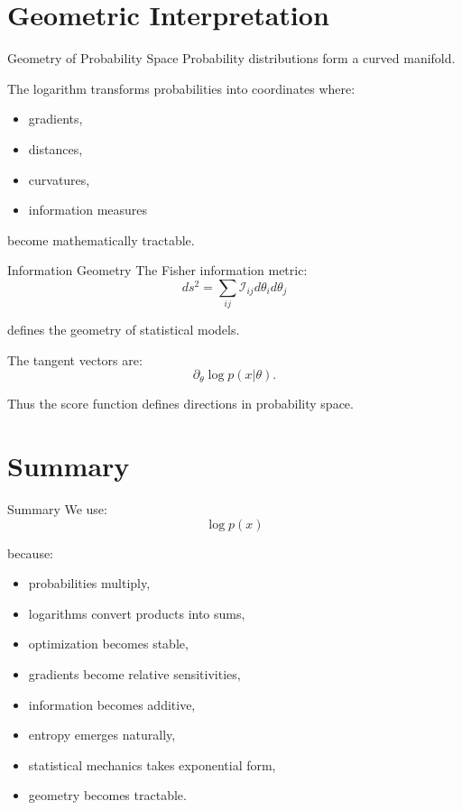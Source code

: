 \documentclass{beamer}
\begin{document}
\section{Geometric Interpretation}

\begin{frame}{Geometry of Probability Space}
Probability distributions form a curved manifold.

\pause

The logarithm transforms probabilities into coordinates where:
\begin{itemize}
\item gradients,
\item distances,
\item curvatures,
\item information measures
\end{itemize}

become mathematically tractable.
\end{frame}

\begin{frame}{Information Geometry}
The Fisher information metric:
\[
ds^2
=
\sum_{ij}
\mathcal I_{ij}
d\theta_i d\theta_j
\]

defines the geometry of statistical models.

\pause

The tangent vectors are:
\[
\partial_\theta \log p(x|\theta).
\]

Thus the score function defines directions in probability space.
\end{frame}

\section{Summary}

\begin{frame}{Summary}
We use:
\[
\log p(x)
\]

because:

\begin{itemize}
\item probabilities multiply,
\item logarithms convert products into sums,
\item optimization becomes stable,
\item gradients become relative sensitivities,
\item information becomes additive,
\item entropy emerges naturally,
\item statistical mechanics takes exponential form,
\item geometry becomes tractable.
\end{itemize}
\end{frame}
\end{document}
